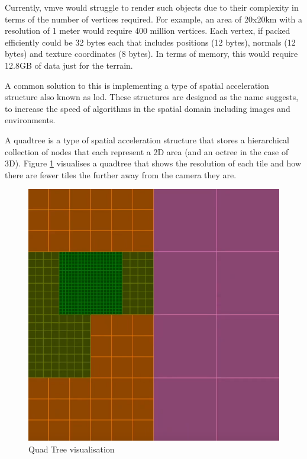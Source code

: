 \documentclass[11pt]{article}
\begin{document}
Currently, \gls*{vmve} would struggle to render such objects due to their
complexity in terms of the number of vertices required. For example, an area of
20x20km with a resolution of 1 meter would require 400 million vertices. Each
vertex, if packed efficiently could be 32 bytes each that includes positions (12
bytes), normals (12 bytes) and texture coordinates (8 bytes). In terms of
memory, this would require 12.8GB of data just for the terrain.

A common solution to this is implementing a type of spatial acceleration
structure also known as \gls*{lod}. These structures are designed as the name
suggests, to increase the speed of algorithms in the spatial domain including
images and environments.

A quadtree is a type of spatial acceleration structure that stores a
hierarchical collection of nodes that each represent a 2D area (and an octree in
the case of 3D). Figure \ref{fig:quad_tree} visualises a quadtree that shows
the resolution of each tile and how there are fewer tiles the further away from
the camera they are.

\begin{figure}[H]
  \centering
  \includegraphics[width=\textwidth]{images/quad_tree.png}
  \caption{Quad Tree visualisation}
  \label{fig:quad_tree}
\end{figure}
\end{document}
